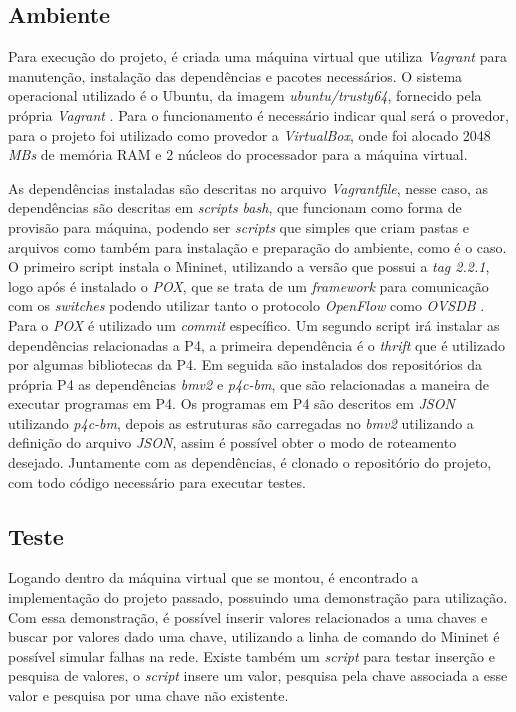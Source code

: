 \documentclass[
    12pt,
    openright, 
    oneside,
    a4paper,
    french,
    english,
    brazil
    ]{facom-ufu-abntex2}
\theoremstyle{definition}
\begin{document}
\subsection{Ambiente}
Para execução do projeto, é criada uma máquina virtual que utiliza \emph{Vagrant} para
manutenção, instalação das dependências e pacotes necessários. O sistema operacional
utilizado é o Ubuntu, da imagem \emph{ubuntu/trusty64}, fornecido pela própria
\emph{Vagrant} \cite{ubuntuTrusty}. Para o funcionamento é necessário indicar qual será
o provedor, para o projeto foi utilizado como provedor a \emph{VirtualBox}, onde foi
alocado 2048 \emph{MBs} de memória RAM e 2 núcleos do processador para a máquina
virtual.

As dependências instaladas são descritas no arquivo \emph{Vagrantfile}, nesse caso,
as dependências são descritas em \emph{scripts bash}, que funcionam como forma
de provisão para máquina, podendo ser \emph{scripts} que simples que criam pastas e arquivos
como também para instalação e preparação do ambiente, como é o caso. O primeiro script 
instala o Mininet, utilizando a versão que possui a \emph{tag 2.2.1}, logo após é instalado 
o \emph{POX}, que se trata de um \emph{framework} para comunicação com os \emph{switches} podendo 
utilizar tanto o protocolo \emph{OpenFlow} como \emph{OVSDB} \cite{poxWiki}. Para o \emph{POX} 
é utilizado um \emph{commit} específico. Um segundo script irá instalar as dependências 
relacionadas a P4, a primeira dependência é o \emph{thrift} que é utilizado por
algumas bibliotecas da P4. Em seguida são instalados dos repositórios da própria P4
as dependências \emph{bmv2} e \emph{p4c-bm}, que são relacionadas a maneira de executar programas em P4.
Os programas em P4 são descritos em \emph{JSON} utilizando \emph{p4c-bm}, depois as estruturas são 
carregadas no \emph{bmv2} utilizando a definição do arquivo \emph{JSON}, assim é possível obter o modo
de roteamento desejado. Juntamente com as dependências, é clonado o repositório do projeto, 
com todo código necessário para executar testes.

\subsection{Teste}

Logando dentro da máquina virtual que se montou, é encontrado a implementação do projeto
passado, possuindo uma demonstração para utilização. Com essa demonstração, é possível
inserir valores relacionados a uma chaves e buscar por valores dado uma chave, utilizando
a linha de comando do Mininet é possível simular falhas na rede. Existe também um \emph{script}
para testar inserção e pesquisa de valores, o \emph{script} insere um valor, pesquisa pela chave
associada a esse valor e pesquisa por uma chave não existente.
\end{document}
